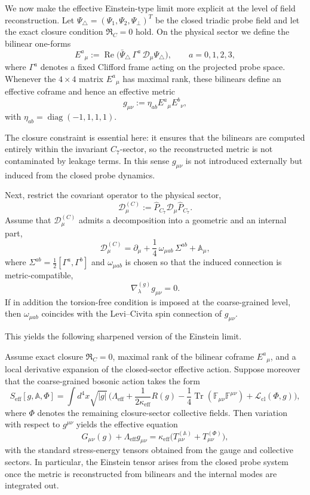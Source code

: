 We now make the effective Einstein-type limit more explicit at the level of
field reconstruction. Let $\Psi_\triangle=(\Psi_1,\Psi_2,\Psi_\perp)^T$ be the
closed triadic probe field and let the exact closure condition
$\mathfrak R_C=0$ hold. On the physical sector we define the bilinear one-forms
\[
 E^a{}_{\mu}
 := \operatorname{Re}\bigl(\bar\Psi_\triangle \,\Gamma^a \, \mathcal D_\mu
 \Psi_\triangle\bigr),
 \qquad a=0,1,2,3,
\]
where $\Gamma^a$ denotes a fixed Clifford frame acting on the projected probe
space. Whenever the $4\times 4$ matrix $E^a{}_{\mu}$ has maximal rank, these
bilinears define an effective coframe and hence an effective metric
\[
 g_{\mu\nu}
 := \eta_{ab} E^a{}_{\mu} E^b{}_{\nu},
\]
with $\eta_{ab}=\operatorname{diag}(-1,1,1,1)$.

The closure constraint is essential here: it ensures that the bilinears are
computed entirely within the invariant $C_7$-sector, so the reconstructed
metric is not contaminated by leakage terms. In this sense $g_{\mu\nu}$ is not
introduced externally but induced from the closed probe dynamics.

Next, restrict the covariant operator to the physical sector,
\[
 \mathcal D^{(C)}_\mu := \hat P_{C_7}\mathcal D_\mu \hat P_{C_7}.
\]
Assume that $\mathcal D^{(C)}_\mu$ admits a decomposition into a geometric and an
internal part,
\[
 \mathcal D^{(C)}_\mu
 = \partial_\mu + \frac14 \, \omega_{\mu ab}\,\Sigma^{ab} + \mathbb A_\mu,
\]
where $\Sigma^{ab}=\frac12[\Gamma^a,\Gamma^b]$ and $\omega_{\mu ab}$ is chosen so
that the induced connection is metric-compatible,
\[
 \nabla^{(g)}_\lambda g_{\mu\nu}=0.
\]
If in addition the torsion-free condition is imposed at the coarse-grained
level, then $\omega_{\mu ab}$ coincides with the Levi--Civita spin connection of
$g_{\mu\nu}$.

This yields the following sharpened version of the Einstein limit.

\begin{proposition}
\label{prop:bilinear-einstein-reconstruction}
Assume exact closure $\mathfrak R_C=0$, maximal rank of the bilinear coframe
$E^a{}_{\mu}$, and a local derivative expansion of the closed-sector effective
action. Suppose moreover that the coarse-grained bosonic action takes the form
\[
 S_{\mathrm{eff}}[g,\mathbb A,\Phi]
 = \int d^4x\sqrt{|g|}\,\bigl(
 \Lambda_{\mathrm{eff}}
 + \frac{1}{2\kappa_{\mathrm{eff}}}R(g)
 - \frac14\operatorname{Tr}(\mathbb F_{\mu\nu}\mathbb F^{\mu\nu})
 + \mathcal L_{\mathrm{cl}}(\Phi,g)
 \bigr),
\]
where $\Phi$ denotes the remaining closure-sector collective fields.
Then variation with respect to $g^{\mu\nu}$ yields the effective equation
\[
 G_{\mu\nu}(g) + \Lambda_{\mathrm{eff}}g_{\mu\nu}
 = \kappa_{\mathrm{eff}}
 \bigl(T^{(\mathbb A)}_{\mu\nu} + T^{(\Phi)}_{\mu\nu}\bigr),
\]
with the standard stress-energy tensors obtained from the gauge and collective
sectors. In particular, the Einstein tensor arises from the closed probe
system once the metric is reconstructed from bilinears and the internal modes
are integrated out.
\end{proposition}

